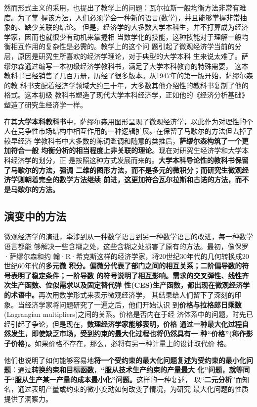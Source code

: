 然而形式主义的采用，也提出了教学上的问题：瓦尔拉斯一般均衡方法非常有难度。为了掌
握该方法，人们必须学会一种新的语言(数学)，并且能够掌握非常抽象的、缺少关联的结论。
但是，经济学的大多数大学本科生，并不打算成为经济学家，因而也就很少有动机来掌握相
当数学化的技能，这种技能对于理解一般均衡相互作用的复杂性是必需的。教学上的这个问
题引起了微观经济学当前的分层，原因是研究生所喜欢的经济学理论，对于典型的大学本科
生来说太难了。萨缪尔森通过编写一本初级经济学教科书，满足了大学本科教育的特殊需要，
这本教科书已经销售了几百万册，历经了很多版本。从1947年的第一版开始，萨缪尔森的教
科书支配着经济学领域大约三十年，大多数其他介绍性的教科书复制了他的格式。这本初级
教科书塑造了现代大学本科经济学，正如他的《经济分析基础》塑造了研究生经济学一样。

在其\textbf{大学本科教科书}中，萨缪尔森用图形呈现了微观经济学，以此作为对理性的个
人在竞争性市场结构中相互作用的一种逻辑扩展。在保留了马歇尔的方法但去掉了较早经济
学教科书中大多数的陈词滥调和随意的类推后，\textbf{萨缪尔森构筑了一个更加符合一般
  均衡分析的相当程度上非关联的理论}。现在对研究生经济学和大学本科经济学的划分，正
是按照这种方式发展而来的。\textbf{大学本科导论性的教科书保留了马歇尔的方法，强调
  二维的图形方法，而不是多元的微积分；而研究生微观经济学则朝着完全的数学方法继续
  前进，这更加符合瓦尔拉斯和古诺的方法，而不是马歇尔的方法。}

\subsection{演变中的方法}

微观经济学的演进，牵涉到从一种数学语言到另一种数学语言的改进，每一种数学语言都能
够解决一些含糊之处，这些含糊之处损害了原有的方法。最初，像保罗·萨缪尔森和约
翰·R·希克斯这样的经济学家，将20世纪30年代的几何转换成20世纪60年代的\textbf{多元微
  积分。偏微分代表了部门之间的相互关系；二阶偏导数的符号表明了稳定条件；一阶导数
  的符号说明了相互影响。需求的交叉弹性、线性齐次生产函数、位似需求以及固定替代弹
  性(CES)生产函数，都出现在微观经济学的术语中。}再次用数学形式来表示微观经济学，
其结果给人们留下了深刻的印象。当经济学家将问题研究了一遍之后，他们开始认识
到\textbf{价格与拉格郎日乘数}(Lagrangian multipliers)之间的关系。价格是否内在于经
济体系中的问题，时先已经引起了争论，但是现在，\textbf{数理经济学家能够表明，价格
  通过一种最大化过程自然发生，即使缺乏市场，受到约束的最大化过程也将仍然具有一
  种“价格”(称作影子价格)。}如果价格不存在，那么，必将有另一种计量上的设计取代价
格。

他们也说明了如何能够容易地\textbf{将一个受约束的最大化问题复述为受约束的最小化问
  题}：通过\textbf{转换约束和目标函数}，\textbf{“服从技术生产约束的产量最大
  化”问题，就等同于“服从生产某一产量的成本最小化”问题。}这样的一种复述，
以“\textbf{二元分析}”而知名，通过表明产量或约束的微小变动如何改变了情况，为研究
最大化问题的性质提供了洞察力。

